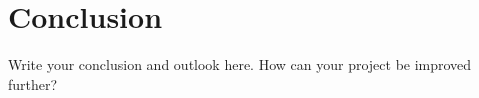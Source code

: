 \section{Conclusion}
Write your conclusion and outlook here.
How can your project be improved further?
